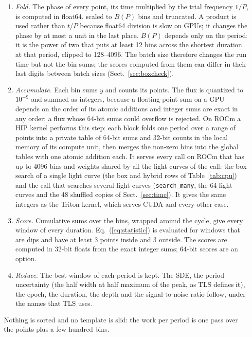 \documentclass{aastex631}
\begin{document}
\begin{enumerate}
\item \emph{Fold.} The phase of every point, its time multiplied by the trial frequency $1/P$, is computed in float64, scaled to $B(P)$ bins and truncated. A product is used rather than $t/P$ because float64 division is slow on GPUs; it changes the phase by at most a unit in the last place. $B(P)$ depends only on the period: it is the power of two that puts at least 12 bins across the shortest duration at that period, clipped to 128--4096. The batch size therefore changes the run time but not the bin sums; the scores computed from them can differ in their last digits between batch sizes (Sect.~\ref{sec:boxcheck}).
\item \emph{Accumulate.} Each bin sums $y$ and counts its points. The flux is quantized to $10^{-9}$ and summed as integers, because a floating-point sum on a GPU depends on the order of its atomic additions and integer sums are exact in any order; a flux whose 64-bit sums could overflow is rejected. On ROCm a HIP kernel performs this step: each block folds one period over a range of points into a private table of 64-bit sums and 32-bit counts in the local memory of its compute unit, then merges the non-zero bins into the global tables with one atomic addition each. It serves every call on ROCm that has up to 4096 bins and weights shared by all the light curves of the call: the box search of a single light curve (the box and hybrid rows of Table~\ref{tab:cpu}) and the call that searches several light curves (\texttt{search\_many}, the 64 light curves and the 48 shuffled copies of Sect.~\ref{sec:time}). It gives the same integers as the Triton kernel, which serves CUDA and every other case.
\item \emph{Score.} Cumulative sums over the bins, wrapped around the cycle, give every window of every duration. Eq.~(\ref{eq:statistic}) is evaluated for windows that are dips and have at least 3 points inside and 3 outside. The scores are computed in 32-bit floats from the exact integer sums; 64-bit scores are an option.
\item \emph{Reduce.} The best window of each period is kept. The SDE, the period uncertainty (the half width at half maximum of the peak, as TLS defines it), the epoch, the duration, the depth and the signal-to-noise ratio follow, under the names that TLS uses.
\end{enumerate}
Nothing is sorted and no template is slid: the work per period is one pass over the points plus a few hundred bins.
\end{document}

